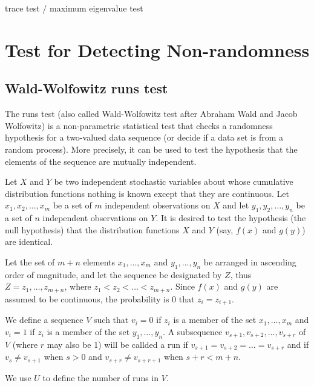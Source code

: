trace test / maximum eigenvalue test

\section{Test for Detecting Non-randomness}


\subsection{Wald-Wolfowitz runs test}

The runs test (also called Wald-Wolfowitz test after Abraham Wald and Jacob Wolfowitz\cite{Wald_Wolfowitz_1940}) is a non-parametric statistical test that checks a randomness hypothesis for a two-valued data sequence (or decide if a data set is from a random process). More precisely, it can be used to test the hypothesis that the elements of the sequence are mutually independent.

Let $X$ and $Y$ be two independent stochastic variables about whose cumulative distribution functions nothing is known except that they are continuous. Let $x_1,x_2,\dots,x_m$ be a set of $m$ independent observations on $X$ and let $y_1,y_2,\dots,y_n$ be a set of $n$ independent observations on $Y$. It is desired to test the hypothesis (the null hypothesis) that the distribution functions $X$ and $Y$ (say, $f(x)$ and $g(y)$) are identical.

Let the set of $m+n$ elements $x_1,\dots,x_m$ and $y_1,\dots,y_n$ be arranged in ascending order of magnitude, and let the sequence be designated by $Z$, thus $Z= z_1,\dots,z_{m+n}$, where $z_1<z_2<\dots<z_{m+n}$.  Since $f(x)$ and $g(y)$ are assumed to be continuous, the probability is 0 that $z_i = z_{i+1}$.

\begin{definition}\label{def:run_random_sequence}
We define a sequence $V$ such that $v_i = 0$ if $z_i$ is a member of the set $x_1,\dots,x_m$ and $v_i = 1$ if $z_i$ is a member of the set $y_1,\dots,y_n$. A subsequence $v_{s+1},v_{s+2},\dots,v_{s+r}$ of $V$ (where $r$ may also be 1) will be callded a run if $v_{s+1} = v_{s+2}= \dots = v_{s+r}$ and if $v_s\neq v_{s+1}$ when $s>0$ and $v_{s+r}\neq v_{s+r+1}$ when $s+r < m+n$.

We use $U$ to define the number of runs in $V$.
\end{definition}

